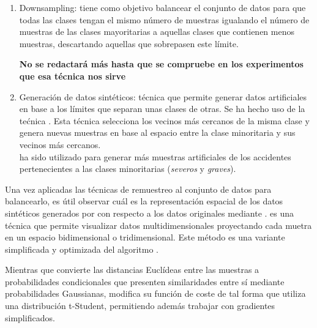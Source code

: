             
            \begin{enumerate}

                \item Downsampling: tiene como objetivo balancear el conjunto de datos para que todas las clases tengan el mismo número de muestras igualando el número de muestras de las clases mayoritarias a aquellas clases que contienen menos muestras, descartando aquellas que sobrepasen este límite. 
                
                
                \cite{Downsampling}

                \textbf{No se redactará más hasta que se compruebe en los experimentos que esa técnica nos sirve}
                

                \item Generación de datos sintéticos: técnica que permite generar datos artificiales en base a los límites que separan unas clases de otras. Se ha hecho uso de la tećnica  \cite{SMOTEII}. Esta técnica selecciona los vecinos más cercanos de la misma clase y genera nuevas muestras en base al espacio entre la clase minoritaria y sus vecinos más cercanos.\\

                 ha sido utilizado para generar más muestras artificiales de los accidentes pertenecientes a las clases minoritarias (\textit{severos} y \textit{graves}).

            \end{enumerate}


            Una vez aplicadas las técnicas de remuestreo al conjunto de datos para balancearlo, es útil observar cuál es la representación espacial de los datos sintéticos generados por  con respecto a los datos originales mediante  \cite{TSNEPaper}.  es una técnica que permite visualizar datos multidimensionales proyectando cada muetra en un espacio bidimensional o tridimensional. Este método es una variante simplificada y optimizada del algoritmo .

            Mientras que  convierte las distancias Euclídeas entre las muestras a probabilidades condicionales que presenten similaridades entre sí mediante probabilidades Gaussianas,  modifica su función de coste de tal forma que utiliza una distribución t-Student, permitiendo además trabajar con gradientes simplificados.



